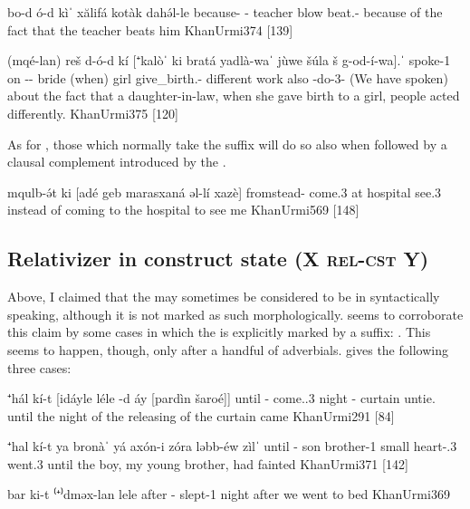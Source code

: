 {bo-d\cb{} ó-d kìˈ xălifá kotàk dahə́l-le}
{because-\cst\cb{} \dem-\cst{} \rel{} teacher blow beat.\masc-\masc}
{because of the fact that the teacher beats him}
{KhanUrmi}{374 {[139]}}

{(mqé-lan) reš\cb{} d-ó-d kí  [⁺kalòˈ ki\cb{} bratá yadlà-waˈ jùwe šúla \cb{}š g-od-í-wa].ˈ}
{spoke-1\pl{} on\cb{} \gen-\dem-\cst{} \rel{}  bride \rel(when)\cb{} girl give\_birth.\fem-\pst{} different work \cb{}also \ind-do-3\pl-\pst}
{(We have spoken) about the fact that a daughter-in-law, when she gave birth to a girl, people acted differently.}
{KhanUrmi}{375 {[120]}}

As for  \prims, those which normally take the \cst* suffix will do so also when followed by a clausal complement introduced by the  .

{m\cb{}qulb-ə́t ki\cb{} [adé geb\cb{} marasxaná əl-lí xazè]}
{from\cb{}stead-\cst{} \rel\cb{} come.3\masc{} at\cb{} hospital \sg{} see.3\masc}
{instead of coming to the hospital to see me}
{KhanUrmi}{569 {[148]}}


\subsection{Relativizer in construct state (X \textsc{rel-cst} Y)} \label{ss:JUrm_rel_cst}

Above, I claimed that the   may sometimes be considered to be in  syntactically speaking, although it is not marked as such morphologically. \JUrm seems to corroborate this claim by some cases in which the  is explicitly marked by a \cst* suffix: . This seems to happen, though, only after a handful of  adverbials.  \citet{KhanUrmi} gives the following three cases:

{⁺hál kí-t [idáyle léle -d\cb{} áy [pardìn šaroé]]}
{until \rel-\cst{} come.\inf.3\masc{} night -\cst\cb{} \lnk{} curtain untie.\inf}
{until the night of the releasing of the curtain came}
{KhanUrmi}{291 {[84]}}

{⁺hal kí-t ya\cb{} bronàˈ yá axón-i zóra ləbb-éw zìlˈ}
{until \rel-\cst{} \dem\cb{} son \dem{} brother-1\sg{} small heart-\poss.3\masc{} went.3\masc}
{until the boy, my young brother, had fainted}
{KhanUrmi}{371 {[142]}}

{bar ki-t ⁽⁺⁾dməx-lan lele}
{after \rel-\cst{} slept-1\pl{} night}
{after we went to bed}
{KhanUrmi}{369}

